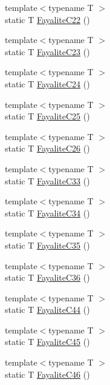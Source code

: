 \begin{DoxyCompactItemize}
\item 
{\footnotesize template$<$typename T $>$ }\\static T \mbox{\hyperlink{namespacempc_1_1data_a8d4b0f4d2f96f186aae8a37e45a80d99}{Fayalite\+C22}} ()
\item 
{\footnotesize template$<$typename T $>$ }\\static T \mbox{\hyperlink{namespacempc_1_1data_a35efede00744fbddccf14174e597091a}{Fayalite\+C23}} ()
\item 
{\footnotesize template$<$typename T $>$ }\\static T \mbox{\hyperlink{namespacempc_1_1data_ae447802f608f083ab7d671612baa819e}{Fayalite\+C24}} ()
\item 
{\footnotesize template$<$typename T $>$ }\\static T \mbox{\hyperlink{namespacempc_1_1data_a1bae114e3f2d4eb0fae81563079c941a}{Fayalite\+C25}} ()
\item 
{\footnotesize template$<$typename T $>$ }\\static T \mbox{\hyperlink{namespacempc_1_1data_ad467139e938bb2cdeadf6eeefbcd2b03}{Fayalite\+C26}} ()
\item 
{\footnotesize template$<$typename T $>$ }\\static T \mbox{\hyperlink{namespacempc_1_1data_a84e780a3fcfd74670c452f9e43e71c93}{Fayalite\+C33}} ()
\item 
{\footnotesize template$<$typename T $>$ }\\static T \mbox{\hyperlink{namespacempc_1_1data_a7ad2f1862d4cb2124ea914313563f252}{Fayalite\+C34}} ()
\item 
{\footnotesize template$<$typename T $>$ }\\static T \mbox{\hyperlink{namespacempc_1_1data_aec3aba2bc3177016cf9d71885d274434}{Fayalite\+C35}} ()
\item 
{\footnotesize template$<$typename T $>$ }\\static T \mbox{\hyperlink{namespacempc_1_1data_a379acfe957ea01fa9574c8a62039f0d7}{Fayalite\+C36}} ()
\item 
{\footnotesize template$<$typename T $>$ }\\static T \mbox{\hyperlink{namespacempc_1_1data_a9df5ded5af4ff010161aadfa3c17d901}{Fayalite\+C44}} ()
\item 
{\footnotesize template$<$typename T $>$ }\\static T \mbox{\hyperlink{namespacempc_1_1data_a3b48fd43a65a420e7e999ba08a031b07}{Fayalite\+C45}} ()
\item 
{\footnotesize template$<$typename T $>$ }\\static T \mbox{\hyperlink{namespacempc_1_1data_ad06ef2357b45feebb7aac4b81443cb6e}{Fayalite\+C46}} ()

\end{DoxyCompactItemize}
